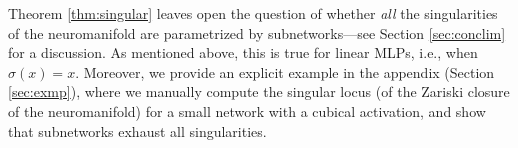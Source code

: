 \documentclass{article} %
\theoremstyle{plain}%
\theoremstyle{definition}
\theoremstyle{remark}
\newtheorem{rmk}{Remark}[section]
\begin{document}
Theorem \ref{thm:singular} leaves open the question of whether \emph{all} the singularities of the neuromanifold are parametrized by subnetworks---see Section \ref{sec:conclim} for a discussion. As mentioned above, this is true for linear MLPs, i.e., when $\sigma(x) =x$. Moreover, we provide an explicit example in the appendix (Section \ref{sec:exmp}), where we manually compute the singular locus (of the Zariski closure of the neuromanifold) for a small network with a cubical activation, and show that subnetworks exhaust all singularities. 

\end{document}
